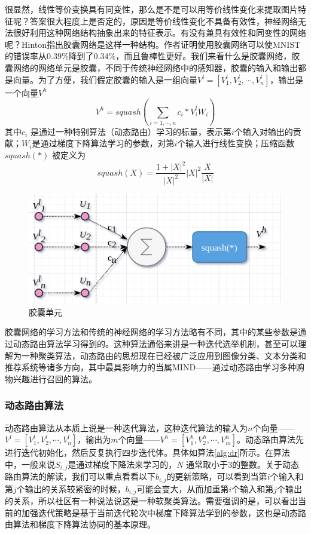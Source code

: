 \documentclass[twoside,a4paper,12pt]{book}%
\begin{document}
很显然，线性等价变换具有同变性，那么是不是可以用等价线性变化来提取图片特征呢？答案很大程度上是否定的，原因是等价线性变化不具备有效性，神经网络无法很好利用这种网络结构抽象出来的特征表示。有没有兼具有效性和同变性的网络呢？Hinton指出胶囊网络是这样一种结构。作者证明使用胶囊网络可以使MNIST的错误率从$0.39\%$降到了$0.34\%$，而且鲁棒性更好。我们来看什么是胶囊网络，胶囊网络的网络单元是胶囊，不同于传统神经网络中的感知器，胶囊的输入和输出都是向量。为了方便，我们假定胶囊的输入是一组向量$V^l=[V^l_1,V^l_2,\cdots, V^l_n]$，输出是一个向量$V^h$
$$
V^h=squash(\sum_{i=1,\cdots ,n}{c_i*V^l_iW_i})
$$
其中$c_i$ 是通过一种特别算法（动态路由）学习的标量，表示第$i$个输入对输出的贡献；$W_i$是通过梯度下降算法学习的参数，对第$i$个输入进行线性变换；压缩函数$squash(*)$ 被定义为
$$squash(X)=\frac{1+|X|^2}{|X|^2}{|X|^2}\frac{X}{|X|}$$
\begin{figure}[ht]
\begin{center}
\includegraphics[width=5.0in]{figures/capsule.png}
\caption{胶囊单元}
\label{fig:capsule}
\end{center}
\end{figure}
胶囊网络的学习方法和传统的神经网络的学习方法略有不同，其中的某些参数是通过动态路由算法学习得到的。这种算法通俗来讲是一种迭代选举机制，甚至可以理解为一种聚类算法，动态路由的思想现在已经被广泛应用到图像分类、文本分类和推荐系统等诸多方向，其中最具影响力的当属MIND——通过动态路由学习多种购物兴趣进行召回的算法。
\subsubsection{动态路由算法}
动态路由算法从本质上说是一种迭代算法，这种迭代算法的输入为$n$个向量——$V^l=[V^l_1,V^l_2,\cdots, V^l_n]$，输出为$m$个向量——$V^h=[V^h_1,V^h_2,\cdots, V^h_m]$。动态路由算法先进行迭代初始化，然后反复执行四步迭代体。具体如算法\ref{alg:dr}所示。在算法中，一般来说$S_{i,j}$是通过梯度下降法来学习的，$N$ 通常取小于$3$的整数。关于动态路由算法的解读，我们可以重点看看以下$b_{i,j}$的更新策略，可以看到当第$i$个输入和第$j$个输出的关系较紧密的时候，$b_{i,j}$可能会变大，从而加重第$i$个输入和第$j$个输出的关系，所以社区有一种说法说这是一种软聚类算法。需要强调的是，可以看出当前的加强迭代策略是基于当前迭代轮次中梯度下降算法学到的参数，这也是动态路由算法和梯度下降算法协同的基本原理。
\end{document}
